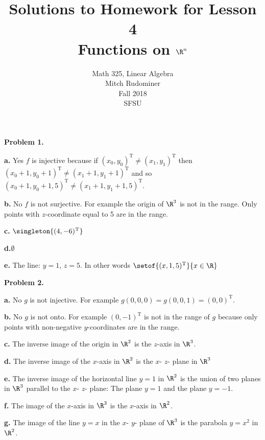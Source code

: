 \documentclass[oneside,12pt]{amsart}
\begin{document}
\title{Solutions to Homework for Lesson 4 \\ Functions on $\R^n$}
\author{Math 325, Linear Algebra \\ Mitch Rudominer \\ Fall 2018 \\ SFSU }
\date{}

\maketitle


\textbf{Problem 1.}

\textbf{a.} Yes $f$ is injective because if $(x_0, y_0)^{\text{T}} \not= (x_1, y_1)^{\text{T}}$
then $(x_0 +1 , y_0 +1)^{\text{T}} \not= (x_1 +1 , y_1 +1)^{\text{T}}$ and so
 $(x_0 +1 , y_0 +1, 5)^{\text{T}} \not= (x_1 +1 , y_1 +1, 5)^{\text{T}}$.


\textbf{b.} No $f$ is not surjective. For example the origin of $\R^3$ is not in
the range. Only points with $z$-coordinate equal to 5 are in the range.


\textbf{c.} $\singleton{(4, -6)^{\text{T}}}$


\textbf{d.}$\emptyset$


\textbf{e.} The line: $y=1$, $z=5$. In other words $\setof{(x,1,5)^{\text{T}}}{x\in\R}$

\medskip

\textbf{Problem 2.}

\textbf{a.} No $g$ is not injective. For example
$g(0,0,0) = g(0, 0,1) = (0,0)^{\text{T}}$.


\textbf{b.} No $g$ is not onto. For example $(0, -1)^{\text{T}}$ is not in the range of
$g$ because only points with non-negative $y$-coordinates are in the range.


\textbf{c.} The inverse image of the origin in $\R^2$ is the $z$-axis in $\R^3$.


\textbf{d.} The inverse image of the $x$-axis in $\R^2$ is the $x$- $z$- plane
in $\R^3$

\textbf{e.} The inverse image of the horizontal line $y=1$ in $\R^2$ is
the union of two planes in $\R^3$ parallel to the $x$- $z$- plane: The
plane $y=1$ and the plane $y=-1$.

\textbf{f.} The image of the $x$-axis in $\R^3$ is the $x$-axis in $\R^2$.

\textbf{g.} The  image of the line $y=x$ in the $x$- $y$- plane
of $\R^3$ is the parabola $y=x^2$ in $\R^2$.


\medskip
\end{document}
